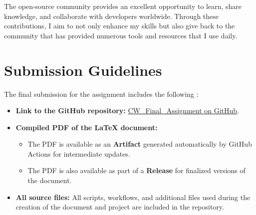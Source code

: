 \documentclass[12pt]{article}
\begin{document}
            The open-source community provides an excellent opportunity to learn, share knowledge, and collaborate with developers worldwide. Through these contributions, I aim to not only enhance my skills but also give back to the community that has provided numerous tools and resources that I use daily.
            
        \section*{Submission Guidelines}

            The final submission for the assignment includes the following :
            
            \begin{itemize}
                \item \textbf{Link to the GitHub repository:} \href{https://github.com/qazalarabali/CW_Final_Assignment}{CW\_Final\_Assignment on GitHub}.
                \item \textbf{Compiled PDF of the LaTeX document:} 
                    \begin{itemize}
                        \item The PDF is available as an \textbf{Artifact} generated automatically by GitHub Actions for intermediate updates.
                        \item The PDF is also available as part of a \textbf{Release} for finalized versions of the document.
                    \end{itemize}
                \item \textbf{All source files:} All scripts, workflows, and additional files used during the creation of the document and project are included in the repository.
            \end{itemize}
            
\end{document}
